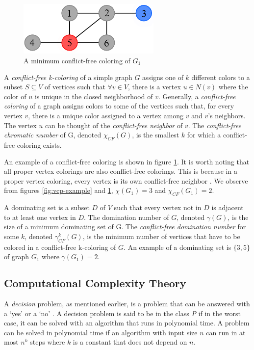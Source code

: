 \documentclass{sig-alternate}
\begin{document}
\begin{figure}[h]
	\centering
	\includegraphics[width=7cm]{../figures/example-cfcp.pdf}
	\caption{A minimum conflict-free coloring of $G_1$}\label{fig:cfcp-example}
\end{figure}

A \emph{conflict-free k-coloring} of a simple graph $G$ assigns one of $k$ different colors to a subset $S \subseteq V$ of vertices such that $\forall v \in V$, there is a vertex $u \in N(v)$ where the color of $u$ is unique in the closed neighborhood of $v$. Generally, a \emph{conflict-free coloring} of a graph assigns colors to some of the vertices such that, for every vertex $v$, there is a unique color assigned to a vertex among $v$ and $v$'s neighbors. The vertex $u$ can be thought of the \emph{conflict-free neighbor} of $v$. The \emph{conflict-free chromatic number} of G, denoted $\chi_{CF}(G)$, is the smallest $k$ for which a conflict-free coloring exists. \cite{abel2017three}

An example of a conflict-free coloring is shown in figure \ref{fig:cfcp-example}. It is worth noting that all proper vertex colorings are also conflict-free colorings. This is because in a proper vertex coloring, every vertex is its own conflict-free neighbor \cite{abel2017three}. We observe from figures \ref{fig:vcp-example} and \ref{fig:cfcp-example}, $\chi(G_1) = 3$ and $\chi_{CF}(G_1) = 2$.

A dominating set is a subset $D$ of $V$ such that every vertex not in $D$ is adjacent to at least one vertex in $D$. The domination number of $G$, denoted $\gamma(G)$, is the size of a minimum dominating set of G. The \emph{conflict-free domination number} for some $k$, denoted $\gamma_{CF}^k(G)$, is the minimum number of vertices that have to be colored in a conflict-free k-coloring of $G$. An example of a dominating set is $\{3, 5\}$ of graph $G_1$ where $\gamma(G_1) = 2$.

\subsection{Computational Complexity Theory}
\label{sec:complexitytheory}
A \emph{decision} problem, as mentioned earlier, is a problem that can be answered with a `yes' or a `no' \cite{sipser2006introduction}. A decision problem is said to be in the class \emph{P} if in the worst case, it can be solved with an algorithm that runs in polynomial time. A problem can be solved in polynomial time if an algorithm with input size $n$ can run in at most $n^k$ steps where $k$ is a constant that does not depend on $n$.
\end{document}

